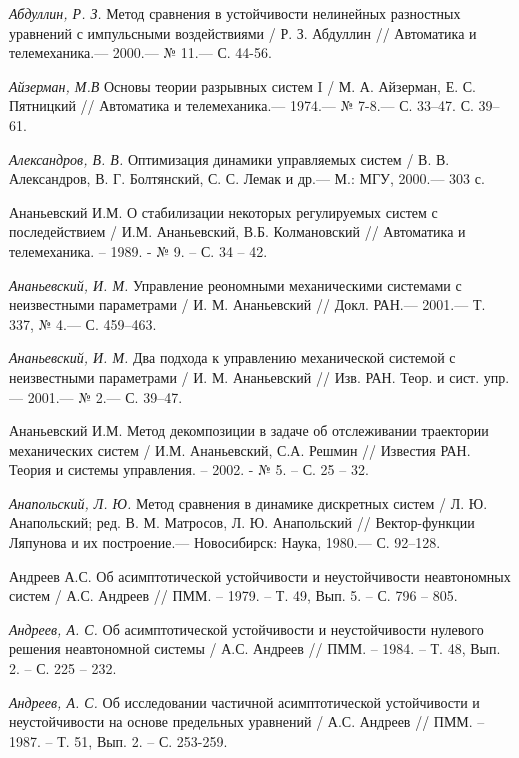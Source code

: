 \begin{thebibliography}{10} \label{bibl}
	{\it Абдуллин, Р. З.} Метод сравнения в устойчивости нелинейных разностных уравнений с импульсными воздействиями
	/ Р. З. Абдуллин // Автоматика и телемеханика.— 2000.— № 11.— С. 44-56. 	
	
	{\it Айзерман, М.В} Основы теории разрывных систем I / М. А. Айзерман, Е. С. Пятницкий
	// Автоматика и телемеханика.— 1974.— № 7-8.— С. 33–47. С. 39–61.
	
	{\it Александров, В. В.} Оптимизация динамики управляемых систем / В. В. Александров, В. Г. Болтянский,
	С. С. Лемак и др.— М.: МГУ, 2000.— 303 с.
	
	Ананьевский И.М. О стабилизации некоторых регулируемых систем с последействием / И.М. Ананьевский, В.Б. Колмановский // Автоматика и телемеханика. – 1989. - № 9. – С. 34 – 42.
	
	{\it Ананьевский, И. М.} Управление реономными механическими системами с неизвестными параметрами /
	И. М. Ананьевский // Докл. РАН.— 2001.— Т. 337, № 4.— С. 459–463.
	
	{\it Ананьевский, И. М.} Два подхода к управлению механической системой с неизвестными параметрами /
	И. М. Ананьевский // Изв. РАН. Теор. и сист. упр.— 2001.— № 2.— С. 39–47.
	
	 Ананьевский И.М. Метод декомпозиции в задаче об отслеживании траектории механических систем / И.М. Ананьевский, С.А. Решмин // Известия РАН. Теория и системы управления. – 2002. - № 5. – С. 25 – 32.
	
	{\it Анапольский, Л. Ю.} Метод сравнения в динамике дискретных систем /
	Л. Ю. Анапольский; ред. В. М. Матросов, Л. Ю. Анапольский // Вектор-функции Ляпунова и их построение.— Новосибирск: Наука, 1980.— С. 92–128.
	
	 Андреев А.С. Об асимптотической устойчивости и неустойчивости неавтономных систем / А.С. Андреев // ПММ. – 1979. – Т. 49, Вып. 5. – С. 796 – 805.
	
	{\it Андреев, А. С.} Об асимптотической устойчивости и неустойчивости нулевого решения неавтономной системы / А.С. Андреев // ПММ. – 1984. – Т. 48, Вып. 2. – С. 225 – 232.
	
	{\it Андреев, А. С.} Об исследовании частичной асимптотической устойчивости и неустойчивости на основе предельных уравнений / А.С. Андреев // ПММ. – 1987. – Т. 51, Вып. 2. – С. 253-259.
	

\end{thebibliography}
